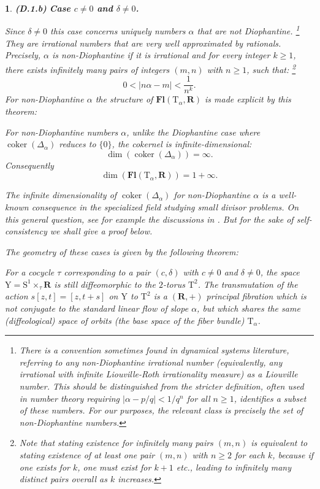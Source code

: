 \documentclass[10pt,letterpaper,reqno]{amsart}
\theoremstyle{article}
\newtheorem{article}[subsection]{}
\newenvironment{theorem*}{\textbf{Theorem.}\it}{}
\newcommand{\1}{{\hat 1}}
\newcommand{\0}{{\hat 0}}
\newcommand{\RR}{\mathbf R}
\def \S{\mathrm S}
\def \T{\mathrm T}
\def \Y{\mathrm Y}
\newcommand{\coker}{\operatorname{coker}}
\newcommand{\cl}[1]{\left[ #1 \right]}
\DeclareMathOperator{\Fb}{\boldsymbol{\mathsf{Fl}}}
\renewcommand{\Fb}{\mathbf{Fl}}
\begin{document}
\begin{article}
    \smallskip\textbf{(D.1.b)} \textbf{Case $c \ne 0$ and $\delta \ne 0$.}
    
    Since $\delta \ne 0$ this case concerns uniquely numbers $\alpha$ that are not Diophantine.%
    \footnote{There is a convention sometimes found in dynamical systems literature,
    referring to any non-Diophantine irrational number
    (equivalently,
    any irrational with infinite Liouville-Roth irrationality measure)
    as a Liouville number.
    This should be distinguished from the stricter definition,
    often used in number theory
    requiring $|\alpha - p/q| < 1/q^n$ for all $n \ge 1$,
    identifies a subset of these numbers.
    For our purposes,
    the relevant class is precisely the set of non-Diophantine numbers.}
    They are irrational numbers that are very well approximated by rationals.
    Precisely,
    $\alpha$ is \emph{non-Diophantine} if it is irrational and for every integer $k \geq 1$,
    there exists infinitely many pairs of integers $(m, n)$ with $n \geq 1$, such that:%
    \footnote{Note that stating existence for infinitely many pairs $(m,n)$ is equivalent to stating existence of at least one pair $(m,n)$ with $n\ge 2$ for each $k$,
    because if one exists for $k$,
    one must exist for $k+1$ etc.,
    leading to infinitely many distinct pairs overall as $k$ increases.}
    $$
      0 < \left| n\alpha - m \right| < \frac{1}{n^k}.
      $$
    For non-Diophantine $\alpha$ the structure of $\Fb(\T_\alpha,\RR)$ is made explicit by this theorem:
    
    \begin{theorem*}
      For non-Diophantine numbers $\alpha$,
      unlike the Diophantine case where $\coker(\Delta_\alpha)$ reduces to $\{0\}$,
      the cokernel is infinite-dimensional:
      $$
        \dim(\coker(\Delta_\alpha)) = \infty.
        $$
      Consequently
      $$
        \dim(\Fb(\T_\alpha,\RR)) = 1 + \infty.
        $$
    \end{theorem*}
    
    The infinite dimensionality of $\coker(\Delta_\alpha)$ for non-Diophantine $\alpha$ is a well-known consequence in the specialized field studying small divisor problems.
    On this general question,
    see for example the discussions in \cite{Her79, Arn83, KH95, Yoc95, For02}.
    But for the sake of self-consistency we shall give a proof below.
    
    The geometry of these cases is given by the following theorem:
    
    \begin{theorem*}
      For a cocycle $\tau$ corresponding to a pair $(c,\delta)$ with $c \ne 0$ and $\delta \ne 0$,
      the space $\Y = \S^1 \times_\tau \RR$ is still diffeomorphic to the $2$-torus $\T^2$.
      The transmutation of the action $s\cl{z,t} = \cl{z,t+s}$ on $\Y$ to $\T^2$ is a $(\RR,+)$ principal fibration which is not conjugate to the standard linear flow of slope $\alpha$,
      but which shares the same (diffeological) space of orbits (the base space of the fiber bundle) $\T_\alpha$.
    \end{theorem*}
    

\end{article}
\end{document}
